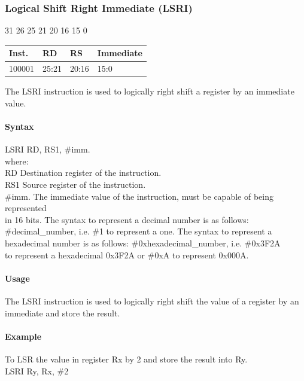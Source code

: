 \documentclass[12pt]{article}
\newcommand{\iTypeInstruction}[6]
{%
    \hspace{1.6cm}31 \hspace{1.15cm}26 \hspace{.05cm}25 \hspace{.8cm}21 \hspace{.05cm}20 \hspace{.8cm}16 \hspace{.05cm}15 \hspace{6.4cm}0
    \vspace{-.25cm}
    \begin{center}
        \begin{tabular}{ |p{1.8cm}|p{1.5cm}|p{1.5cm}|p{6.8cm}| }
            \hline
            \textbf{Inst.} & \textbf{RD} &  \textbf{RS} & \textbf{Immediate}\\
            \hline
            #1 & 25:21 & 20:16 &15:0\\
            \hline
        \end{tabular}
    \end{center}
    
    \noindent
    #2
    
    \paragraph{Syntax}
    \begin{flushleft}
    #3 RD, RS1, \#imm.\\
    \vspace{1em}        %
    where:\\
    \vspace{1em}
    RD  \hspace{3.6em} Destination register of the instruction.\\
    \vspace{1em}
    RS1  \hspace{3.35em} Source register of the instruction.\\
    \vspace{1em}
    \#imm.  \hspace{1.8em} The immediate value of the instruction, must be capable of being represented\\             \hspace{5.4em} in 16 bits. The syntax to represent a decimal number is as follows:\\
            \hspace{5.4em} \#decimal\_number, i.e. \#1 to represent a one. The syntax to represent a\\
            \hspace{5.4em} hexadecimal number is as follows: \#0xhexadecimal\_number, i.e. \#0x3F2A \\
            \hspace{5.4em} to represent a hexadecimal 0x3F2A or \#0xA to represent 0x000A.\\
    \end{flushleft}
    
    \paragraph{Usage}
    \begin{flushleft}
    #4\\
    \end{flushleft}
    \paragraph{Example}
    \begin{flushleft}
    #5\\
    \vspace{1em}
    #6
    \end{flushleft}}
\begin{document}



    \newpage
    \subsubsection{Logical Shift Right Immediate (LSRI)}
    
    \iTypeInstruction
    {100001}
    {The LSRI instruction is used to logically right shift a register by an immediate value.}
    {LSRI}
    {The LSRI instruction is used to logically right shift the value of a register by an immediate and store the result.}
    {To LSR the value in register Rx by 2 and store the result into Ry.}
    {LSRI Ry, Rx, \#2}
    
    
    
\end{document}
